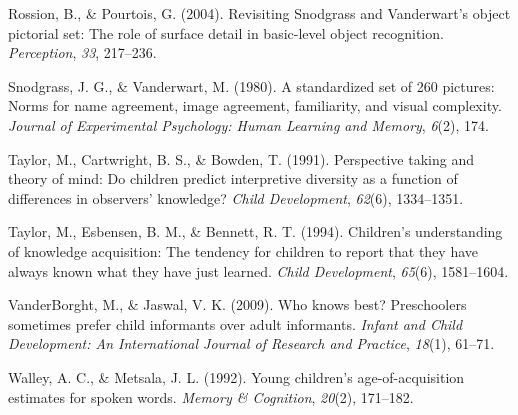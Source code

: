 \documentclass[10pt, letterpaper]{article}
\begin{document}
\leavevmode\hypertarget{ref-rossion2004}{}%
Rossion, B., \& Pourtois, G. (2004). Revisiting Snodgrass and
Vanderwart's object pictorial set: The role of surface detail in
basic-level object recognition. \emph{Perception}, \emph{33}, 217--236.

\leavevmode\hypertarget{ref-snodgrass1980}{}%
Snodgrass, J. G., \& Vanderwart, M. (1980). A standardized set of 260
pictures: Norms for name agreement, image agreement, familiarity, and
visual complexity. \emph{Journal of Experimental Psychology: Human
Learning and Memory}, \emph{6}(2), 174.

\leavevmode\hypertarget{ref-taylor1991}{}%
Taylor, M., Cartwright, B. S., \& Bowden, T. (1991). Perspective taking
and theory of mind: Do children predict interpretive diversity as a
function of differences in observers' knowledge? \emph{Child
Development}, \emph{62}(6), 1334--1351.

\leavevmode\hypertarget{ref-taylor1994}{}%
Taylor, M., Esbensen, B. M., \& Bennett, R. T. (1994). Children's
understanding of knowledge acquisition: The tendency for children to
report that they have always known what they have just learned.
\emph{Child Development}, \emph{65}(6), 1581--1604.

\leavevmode\hypertarget{ref-vanderborght2009}{}%
VanderBorght, M., \& Jaswal, V. K. (2009). Who knows best? Preschoolers
sometimes prefer child informants over adult informants. \emph{Infant
and Child Development: An International Journal of Research and
Practice}, \emph{18}(1), 61--71.

\leavevmode\hypertarget{ref-walley1992}{}%
Walley, A. C., \& Metsala, J. L. (1992). Young children's
age-of-acquisition estimates for spoken words. \emph{Memory \&
Cognition}, \emph{20}(2), 171--182.


\end{document}
